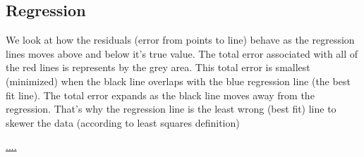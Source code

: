 \documentclass[
]{book}
\begin{document}
\hypertarget{regression}{%
\subsection{Regression}\label{regression}}

We look at how the residuals (error from points to line) behave as the regression lines moves above and below it's true value. The total error associated with all of the red lines is represents by the grey area. This total error is smallest (minimized) when the black line overlaps with the blue regression line (the best fit line). The total error expands as the black line moves away from the regression. That's why the regression line is the least wrong (best fit) line to skewer the data (according to least squares definition)

\url{....}
\end{document}
